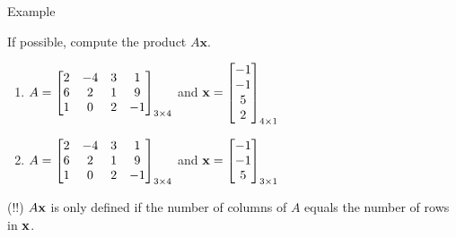 \documentclass[xcolor=dvipsnames,aspectratio=169,t]{beamer}
\begin{document}
\begin{frame}{Example}
  
  If possible, compute the product $A \mathbf{x}$. \ms
  
\begin{enumerate}
\item $\displaystyle A = \begin{bmatrix} 2 & -4 & 3 & 1\\ 6 & 2 & 1 & 9\\ 1 & 0 & 2 &-1 \end{bmatrix}_{3\times 4}$ and $\displaystyle \mathbf{x} = \begin{bmatrix} -1 \\ -1 \\ 5 \\ 2 \end{bmatrix}_{4 \times 1}$
\vspace*{3em}

\item $\displaystyle A = \begin{bmatrix} 2 & -4 & 3 & 1\\ 6 & 2 & 1 & 9\\ 1 & 0 & 2 &-1 \end{bmatrix}_{3 \times 4}$ and $\displaystyle \mathbf{x} = \begin{bmatrix} -1 \\ -1 \\ 5  \end{bmatrix}_{3 \times 1}$
\end{enumerate}

\vspace{2em}

\bbox
(\alert{!!}) $A \mathbf{x}$ is only defined if the number of columns of $A$ equals the number of rows in $\mathbf{x}$.
\ebox

\end{frame}
\end{document}
